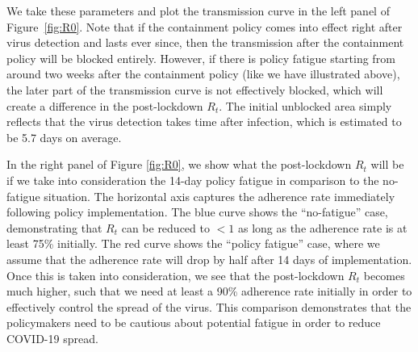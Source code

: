 \documentclass[dvipsnames]{article}
\begin{document}
We take these parameters and plot the transmission curve in the left panel of Figure~\ref{fig:R0}. Note that if the containment policy comes into effect right after virus detection and lasts ever since, then the transmission after the containment policy will be blocked entirely. However, if there is policy fatigue starting from around two weeks after the containment policy (like we have illustrated above), the later part of the transmission curve is not effectively blocked, which will create a difference in the post-lockdown $R_t$. The initial unblocked area simply reflects that the virus detection takes time after infection, which is estimated to be 5.7 days on average.

In the right panel of Figure \ref{fig:R0}, we show what the post-lockdown $R_t$ will be if we take into consideration the 14-day policy fatigue in comparison to the no-fatigue situation. The horizontal axis captures the adherence rate immediately following policy implementation. The blue curve shows the ``no-fatigue'' case, demonstrating that $R_t$ can be reduced to $<1$ as long as the adherence rate is at least 75\% initially. The red curve shows the ``policy fatigue'' case, where we assume that the adherence rate will drop by half after 14 days of implementation. Once this is taken into consideration, we see that the post-lockdown $R_t$ becomes much higher, such that we need at least a 90\% adherence rate initially in order to effectively control the spread of the virus. This comparison demonstrates that the policymakers need to be cautious about potential fatigue in order to reduce COVID-19 spread.
\end{document}
